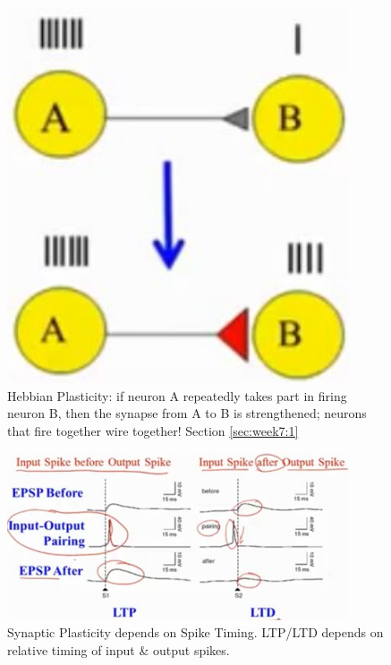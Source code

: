 \documentclass[]{article}
\begin{document}
\begin{figure}[H]
	\begin{center}
		\caption[Hebbian Plasticity]{Hebbian Plasticity: if neuron A repeatedly takes part in firing neuron B, then the synapse from A to B is strengthened; neurons that fire together wire together! Section \ref{sec:week7:1}}\label{fig:hebbian-plasticity}
		\includegraphics[width=0.9\textwidth]{hebbian-plasticity}
	\end{center}
\end{figure}

\begin{figure}[H]
	\caption[Synaptic Plasticity depends on Spike Timing]{Synaptic Plasticity depends on Spike Timing. LTP/LTD depends on relative timing of input \& output spikes.}
	\includegraphics[width=0.9\textwidth]{ltp-ltd}
\end{figure}
\end{document}
